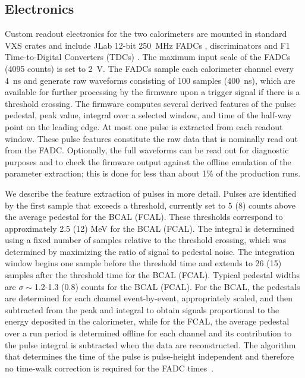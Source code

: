 \subsection{Electronics \label{sec:calelectronics}}
Custom readout electronics for the two calorimeters are mounted in standard VXS crates and include 
JLab 12-bit 250~MHz FADCs \cite{hdnote1022}, discriminators \cite{hdnote2511} and F1 Time-to-Digital Converters (TDCs) \cite{hdnote1021}. The maximum input scale of the FADCs (4095 counts) is set to 2~V.
The FADCs sample each calorimeter channel every 4~ns and generate raw waveforms consisting of 100 samples 
 (400~ns), which are available for further processing by the firmware upon a trigger signal if there is a threshold crossing. The firmware computes several derived features of the pulse: pedestal, peak value, integral over a selected window, and time of the half-way point on the leading edge. At most one pulse is extracted from each readout window. These pulse features constitute the raw data that is nominally read out from the FADC.  Optionally, the full waveforms can be read out for diagnostic purposes and to check the firmware output against the offline emulation of the parameter extraction; this is done for less than about 1\% of the production runs.
 
We describe the feature extraction of pulses in more detail.
Pulses are identified by the first sample that exceeds a threshold, currently set to 5 (8) counts above the average pedestal for the BCAL (FCAL). These thresholds correspond to approximately 2.5 (12) MeV for the BCAL (FCAL). The integral is determined using a fixed number of samples relative to the threshold crossing, which was determined by maximizing the ratio of signal to pedestal noise.  The integration window begins one sample before the threshold time and extends to 26 (15) samples after the threshold time for the BCAL (FCAL).  Typical pedestal widths are $\sigma\sim$1.2-1.3 (0.8) counts for the BCAL (FCAL).  For the BCAL, the pedestals are determined for each channel event-by-event, appropriately scaled, and then subtracted from the peak and integral to obtain signals proportional to the energy deposited in the calorimeter, while for the FCAL, the average pedestal over a run period is determined offline for each channel and its contribution to the pulse integral is subtracted when the data are reconstructed.  %
 The algorithm that determines the time of the pulse is pulse-height independent and therefore no time-walk correction is required for the FADC times~\cite{Bennett:2010nf}.

